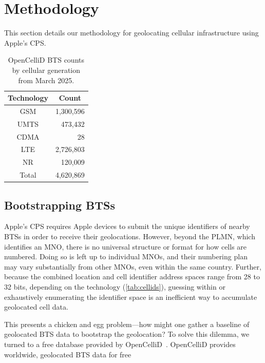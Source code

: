 \section{Methodology}
\label{sec:methodology}

This section details our methodology for geolocating cellular infrastructure
using Apple's \ac{CPS}. 

\begin{table}[t]
    \centering
    \caption{OpenCelliD \ac{BTS} counts by cellular generation from March 2025.}
    \label{tab:opencellid-counts}
    \begin{tabular}{c|r}
    \textbf{Technology} & \multicolumn{1}{|c}{\textbf{Count}} \\
    \hline
    GSM & 1,300,596  \\
    UMTS & 473,432 \\
    CDMA & 28 \\
    LTE & 2,726,803 \\
    NR & 120,009  \\
    \hline
    Total & 4,620,869
    \end{tabular}
\end{table}

\subsection{Bootstrapping \acp{BTS}}

Apple's \ac{CPS} requires Apple devices to submit the unique identifiers of
nearby \acp{BTS} in order to receive their geolocations. However, beyond the
\ac{PLMN}, which identifies an \ac{MNO}, there is no universal structure or
format for how cells are numbered. Doing so is left up to individual \acp{MNO},
and their numbering plan may vary substantially from other \acp{MNO}, even
within the same country. Further, because the combined location and cell
identifier address spaces range from 28 to 32 bits, depending on the technology
(\ref{tab:cellids}), guessing within or exhaustively enumerating the identifier
space is an inefficient way to accumulate geolocated cell data.

This presents a chicken and egg problem---how might one gather a baseline of
geolocated \ac{BTS} data to bootstrap the geolocation? To solve this dilemma, we
turned to a free database provided by OpenCelliD~\cite{opencellid}. OpenCelliD
provides worldwide, geolocated \ac{BTS} data for free
